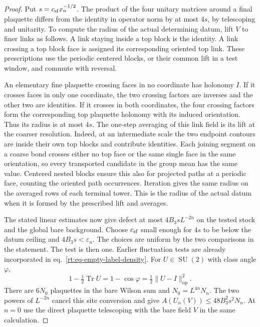 \documentclass[11pt,letterpaper,reqno]{amsart}
\numberwithin{equation}{section}
\renewcommand{\eqref}[1]{\textup{eq.~\ref{#1}}}
\theoremstyle{definition}
\theoremstyle{remark}
\begin{document}
\begin{proof}
Put \(s=c_{\rm sf}x_n^{-1/2}\). The product of the four unitary
matrices around a final plaquette differs from the identity
in operator norm by at most \(4s\), by telescoping and
unitarity. To compute the radius of the actual determining
datum, lift \(V\) to finer links as follows. A link staying
inside a top block is the identity. A link crossing a top
block face is assigned its corresponding oriented top link.
These prescriptions use the periodic centered blocks, or
their common lift in a test window, and commute with reversal.

An elementary fine plaquette crossing faces in no coordinate
has holonomy \(I\). If it crosses faces in only one coordinate,
the two crossing factors are inverses and the other two are
identities. If it crosses in both coordinates, the four
crossing factors form the corresponding top plaquette
holonomy with its induced orientation. Thus its radius is
at most \(4s\). The one-step averaging of this link field
is its lift at the coarser resolution. Indeed, at an
intermediate scale the two endpoint contours are inside
their own top blocks and contribute identities. Each joining
segment on a coarse bond crosses either no top face or
the same single face in the same orientation, so every
transported candidate in the group mean has the same value.
Centered nested blocks ensure this also for projected paths
at a periodic face, counting the oriented path occurrences.
Iteration gives the same radius on the averaged rows of
each terminal tower. This is the radius of the actual datum
when it is formed by the prescribed lift and averages.

The stated linear estimates now give defect at most
\(4B_3sL^{-2n}\) on the tested stock and the global bare
background. Choose \(c_{\rm sf}\) small enough for \(4s\) to be
below the datum ceiling and \(4B_3s<\varepsilon_n\).
The choices are uniform by the two comparisons in the
statement. The test is then one. Earlier fluctuation tests
are already incorporated in \eqref{rt:eq-empty-label-density}.
For \(U\in\operatorname{SU}(2)\) with class angle \(\varphi\),
\[
      1-\tfrac12\operatorname{Tr}U
         =1-\cos\varphi=\tfrac12\|U-I\|_{\mathrm{op}}^2 .
\]
There are \(6N_0\) plaquettes in the bare Wilson sum and
\(N_0=L^{4n}N_n\). The two powers of \(L^{-2n}\) cancel
this site conversion and give
\(A(U_n(V))\le48B_3^2s^2N_n\).
At \(n=0\) use the direct plaquette telescoping with the
bare field \(V\) in the same calculation.
\end{proof}
\end{document}
